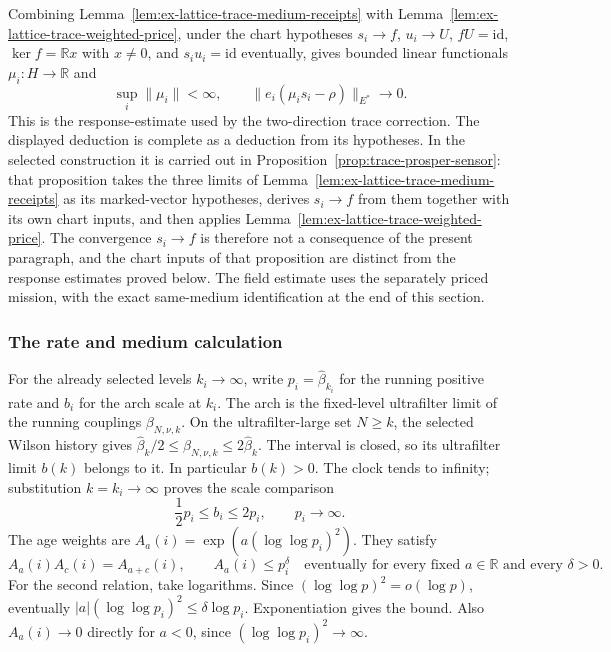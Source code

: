 Combining Lemma~\ref{lem:ex-lattice-trace-medium-receipts} with
Lemma~\ref{lem:ex-lattice-trace-weighted-price}, under the chart hypotheses
$s_i\to f$, $u_i\to U$, $fU=\mathrm{id}$, $\ker f=\mathbb Rx$ with
$x\ne0$, and $s_i u_i=\mathrm{id}$ eventually, gives bounded linear
functionals $\mu_i:H\to\mathbb R$ and
\[
 \sup_i\|\mu_i\|<\infty,
 \qquad
 \bigl\|e_i(\mu_i s_i-\rho)\bigr\|_{E^*}\longrightarrow0.
\]
This is the response-estimate used by the two-direction trace
correction. The displayed deduction is complete as a deduction from its
hypotheses. In the selected construction it is carried out in
Proposition~\ref{prop:trace-prosper-sensor}: that proposition takes the three limits of
Lemma~\ref{lem:ex-lattice-trace-medium-receipts} as its marked-vector
hypotheses, derives $s_i\to f$ from them together with its own chart
inputs, and then applies
Lemma~\ref{lem:ex-lattice-trace-weighted-price}. The convergence
$s_i\to f$ is therefore not a consequence of the present paragraph, and
the chart inputs of that proposition are distinct from the response
estimates proved below. The field estimate uses the separately priced
mission, with the exact same-medium identification at the end of this section.

\subsubsection{The rate and medium calculation}
\label{subsec:ex-lattice-trace-source-rate}

For the already selected levels $k_i\to\infty$, write
$p_i=\widehat\beta_{k_i}$ for the running positive rate and $b_i$ for the
arch scale at $k_i$. The arch is the fixed-level ultrafilter limit of the running couplings
$\beta_{N,\nu,k}$. On the ultrafilter-large set $N\ge k$, the
selected Wilson history gives
$\widehat\beta_k/2\le\beta_{N,\nu,k}\le2\widehat\beta_k$.
The interval is closed, so its ultrafilter limit $b(k)$ belongs to it.
In particular $b(k)>0$. The clock tends to infinity; substitution
$k=k_i\to\infty$ proves the scale comparison
\begin{equation}
 \frac12p_i\le b_i\le 2p_i,\qquad p_i\longrightarrow\infty.
 \label{eq:ex-lattice-trace-arch-comparison}
\end{equation}
The age weights are $A_a(i)=\exp(a(\log\log p_i)^2)$. They satisfy
\begin{equation}
 A_a(i)A_c(i)=A_{a+c}(i),\qquad
 A_a(i)\le p_i^\delta\quad\text{eventually for every fixed }a\in\mathbb R
 \text{ and every }\delta>0.
 \label{eq:ex-lattice-trace-age-rules}
\end{equation}
For the second relation, take logarithms. Since
$(\log\log p)^2=o(\log p)$, eventually
$|a|(\log\log p_i)^2\le\delta\log p_i$. Exponentiation gives the bound.
Also $A_a(i)\to0$ directly for $a<0$, since
$(\log\log p_i)^2\to\infty$.


